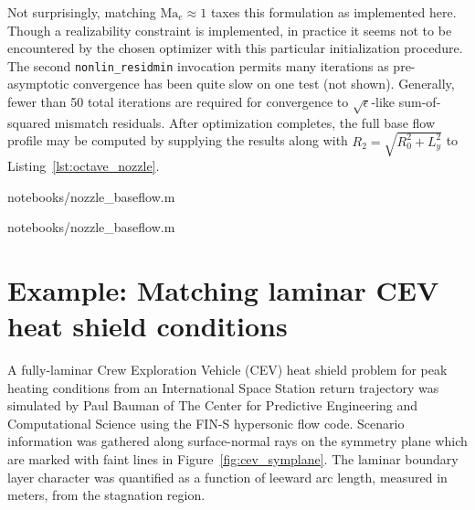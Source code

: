 \documentclass[letterpaper,11pt,nointlimits,reqno]{amsart}
\newcommand{\Mach}[1][]{\mbox{Ma}_{#1}}
\begin{document}
Not surprisingly, matching $\Mach[e]{}\approx{}1$ taxes this formulation as
implemented here.  Though a realizability constraint is implemented, in practice
it seems not to be encountered by the chosen optimizer with this particular
initialization procedure.  The second \texttt{nonlin\_residmin} invocation
permits many iterations as pre-asymptotic convergence has been quite slow on
one test (not shown).  Generally, fewer than 50 total iterations are required
for convergence to $\sqrt{\epsilon}$-like sum-of-squared mismatch residuals.
After optimization completes, the full base flow profile may be computed by
supplying the results along with $R_2 = \sqrt{R_0^2 + L_y^2}$ to
Listing~\ref{lst:octave_nozzle}.


                {notebooks/nozzle_baseflow.m}


                {notebooks/nozzle_baseflow.m}

\clearpage

\section{Example: Matching laminar CEV heat shield conditions}

A fully-laminar Crew Exploration Vehicle (CEV) heat shield problem for peak
heating conditions from an International Space Station return trajectory was
simulated by Paul Bauman of The Center for Predictive Engineering and
Computational Science using the FIN-S hypersonic flow
code\citep{KirkModeling2013}.  Scenario information was gathered along
surface-normal rays on the symmetry plane which are marked with faint lines in
Figure~\ref{fig:cev_symplane}.  The laminar boundary layer character was
quantified as a function of leeward arc length, measured in meters, from the
stagnation region.
\end{document}
